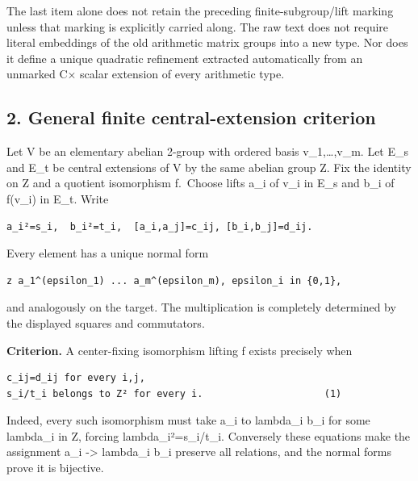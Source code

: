 The last item alone does not retain the preceding finite-subgroup/lift
marking unless that marking is explicitly carried along. The raw text
does not require literal embeddings of the old arithmetic matrix groups
into a new type. Nor does it define a unique quadratic refinement
extracted automatically from an unmarked C× scalar extension of every
arithmetic type.

\hypertarget{dyadic_markings-general-finite-central-extension-criterion}{%
\subsection{2. General finite central-extension
criterion}\label{dyadic_markings-general-finite-central-extension-criterion}}

Let V be an elementary abelian 2-group with ordered basis
v\_1,\ldots,v\_m. Let E\_s and E\_t be central extensions of V by the
same abelian group Z. Fix the identity on Z and a quotient isomorphism
f.~Choose lifts a\_i of v\_i in E\_s and b\_i of f(v\_i) in E\_t. Write

\begin{Verbatim}[fontsize=\small,breaklines=true,breakanywhere=true]
a_i²=s_i,  b_i²=t_i,  [a_i,a_j]=c_ij, [b_i,b_j]=d_ij.
\end{Verbatim}

Every element has a unique normal form

\begin{Verbatim}[fontsize=\small,breaklines=true,breakanywhere=true]
z a_1^(epsilon_1) ... a_m^(epsilon_m), epsilon_i in {0,1},
\end{Verbatim}

and analogously on the target. The multiplication is completely
determined by the displayed squares and commutators.

\textbf{Criterion.} A center-fixing isomorphism lifting f exists
precisely when

\begin{Verbatim}[fontsize=\small,breaklines=true,breakanywhere=true]
c_ij=d_ij for every i,j,
s_i/t_i belongs to Z² for every i.                     (1)
\end{Verbatim}

Indeed, every such isomorphism must take a\_i to lambda\_i b\_i for some
lambda\_i in Z, forcing lambda\_i²=s\_i/t\_i. Conversely these equations
make the assignment a\_i -\textgreater{} lambda\_i b\_i preserve all
relations, and the normal forms prove it is bijective.

